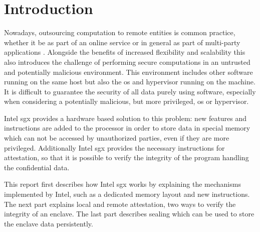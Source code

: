 \section{Introduction} \label{sec:introduction}
Nowadays, outsourcing computation to remote entities is common practice, whether it be as part of an online service or 
in general as part of multi-party applications \cite{UseOfIntelSGX}. 
Alongside the benefits of increased flexibility and scalability this also introduces the challenge of performing secure 
computations in an untrusted and potentially malicious environment. 
This environment includes other software running on the same host but also the \ac{os} and hypervisor running
on the machine.
It is difficult to guarantee the security of all data purely using software, especially when considering a potentially 
malicious, but more privileged, \ac{os} or hypervisor.

Intel \ac{sgx} provides a hardware based solution to this problem: new features and instructions are added to the processor
in order to store data in special memory which can not be accessed by unauthorized parties, even if they are more
privileged. Additionally Intel \ac{sgx} provides the necessary instructions for attestation, so that it is possible to
verify the integrity of the program handling the confidential data.

This report first describes how Intel \ac{sgx} works by explaining the mechanisms implemented by Intel, such as a
dedicated memory layout and new instructions. The next part explains local and remote attestation, two ways to
verify the integrity of an enclave. The last part describes sealing which can be used to store the enclave data
persistently.
